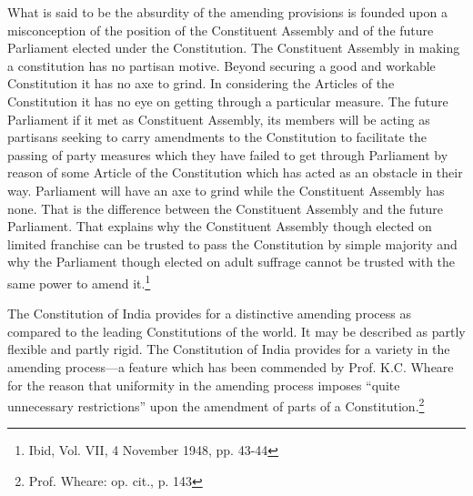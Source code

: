 \begin{multicols}{2}
\noi
What is said to be the absurdity of the amending provisions is founded upon a misconception
of the position of the Constituent Assembly and of the future Parliament elected under the
Constitution. The Constituent Assembly in making a constitution has no partisan motive.
Beyond securing a good and workable Constitution it has no axe to grind. In considering the
Articles of the Constitution it has no eye on getting through a particular measure. The future Parliament if it met as Constituent Assembly, its members will be acting as partisans seeking
to carry amendments to the Constitution to facilitate the passing of party measures which they
have failed to get through Parliament by reason of some Article of the Constitution which has
acted as an obstacle in their way. Parliament will have an axe to grind while the Constituent
Assembly has none. That is the difference between the Constituent Assembly and the future
Parliament. That explains why the Constituent Assembly though elected on limited franchise
can be trusted to pass the Constitution by simple majority and why the Parliament though
elected on adult suffrage cannot be trusted with the same power to amend it.\footnote{Ibid, Vol. VII, 4 November 1948, pp. 43-44}

\vspace{-.1cm}


\vspace{-.15cm}

\noi
The Constitution of India provides for a distinctive amending process as compared to the
leading Constitutions of the world. It may be described as partly flexible and partly rigid. The
Constitution of India provides for a variety in the amending process—a feature which has
been commended by Prof. K.C. Wheare for the reason that uniformity in the amending process
imposes “quite unnecessary restrictions” upon the amendment of parts of a Constitution.\footnote{Prof. Wheare: op. cit., p. 143}

\vspace{-.2cm}


\end{multicols}
